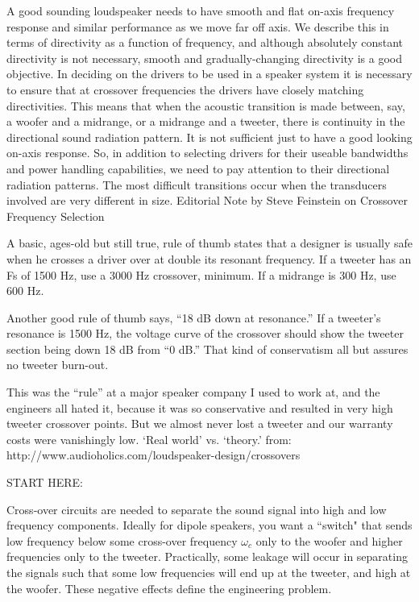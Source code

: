 \documentclass[10pt]{book}
\begin{document}
A good sounding loudspeaker needs to have smooth and flat on-axis frequency response and similar performance as we move far off axis.  We describe this in terms of directivity as a function of frequency, and although absolutely constant directivity is not necessary, smooth and gradually-changing directivity is a good objective.  In deciding on the drivers to be used in a speaker system it is necessary to ensure that at crossover frequencies the drivers have closely matching directivities.  This means that when the acoustic transition is made between, say, a woofer and a midrange, or a midrange and a tweeter, there is continuity in the directional sound radiation pattern. It is not sufficient just to have a good looking on-axis response.  So, in addition to selecting drivers for their useable bandwidths and power handling capabilities, we need to pay attention to their directional radiation patterns. The most difficult transitions occur when the transducers involved are very different in size.
Editorial Note by Steve Feinstein on Crossover Frequency Selection

A basic, ages-old but still true, rule of thumb states that a designer is usually safe when he crosses a driver over at double its resonant frequency. If a tweeter has an Fs of 1500 Hz, use a 3000 Hz crossover, minimum. If a midrange is 300 Hz, use 600 Hz.

Another good rule of thumb says, “18 dB down at resonance.” If a tweeter’s resonance is 1500 Hz, the voltage curve of the crossover should show the tweeter section being down 18 dB from “0 dB.” That kind of conservatism all but assures no tweeter burn-out.

This was the “rule” at a major speaker company I used to work at, and the engineers all hated it, because it was so conservative and resulted in very high tweeter crossover points. But we almost never lost a tweeter and our warranty costs were vanishingly low. ‘Real world’ vs. ‘theory.’
from:
http://www.audioholics.com/loudspeaker-design/crossovers



START HERE:

Cross-over circuits are needed to separate the sound signal into high and low frequency components. Ideally for dipole speakers, you want a ``switch" that sends low frequency below some cross-over frequency $\omega_c$ only to the woofer and higher frequencies only to the tweeter. Practically, some leakage will occur in separating the signals such that some low frequencies will end up at the tweeter, and high at the woofer.  These negative effects define the engineering problem.
\end{document}
